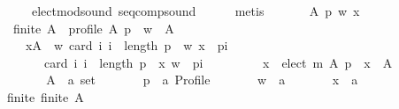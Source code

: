 \begin{isabellebody}
\ \ \ \ \ \ \ \ \ \ elect{\isacharunderscore}{\kern0pt}mod{\isacharunderscore}{\kern0pt}sound\ seq{\isacharunderscore}{\kern0pt}comp{\isacharunderscore}{\kern0pt}sound\isanewline
\ \ \ \ \isamarkupfalse%
\ metis\isanewline
{}\isamarkupfalse%
\isanewline
\ \ \isamarkupfalse%
\isanewline
\ \ \ \ {\isachardoublequoteopen}{\isasymAnd}A\ p\ w\ x{\isachardot}{\kern0pt}\isanewline
\ \ \ \ \ \ \ finite\ A\ {\isasymLongrightarrow}\ profile\ A\ p\ {\isasymLongrightarrow}\ w\ {\isasymin}\ A\ {\isasymLongrightarrow}\isanewline
\ \ \ \ \ \ \ \ \ {\isasymforall}x{\isasymin}A\ {\isacharminus}{\kern0pt}\ {\isacharbraceleft}{\kern0pt}w{\isacharbraceright}{\kern0pt}{\isachardot}{\kern0pt}\ card\ {\isacharbraceleft}{\kern0pt}i{\isachardot}{\kern0pt}\ i\ {\isacharless}{\kern0pt}\ length\ p\ {\isasymand}\ {\isacharparenleft}{\kern0pt}w{\isacharcomma}{\kern0pt}\ x{\isacharparenright}{\kern0pt}\ {\isasymin}\ {\isacharparenleft}{\kern0pt}p{\isacharbang}{\kern0pt}i{\isacharparenright}{\kern0pt}{\isacharbraceright}{\kern0pt}\ {\isacharless}{\kern0pt}\isanewline
\ \ \ \ \ \ \ \ \ \ \ \ card\ {\isacharbraceleft}{\kern0pt}i{\isachardot}{\kern0pt}\ i\ {\isacharless}{\kern0pt}\ length\ p\ {\isasymand}\ {\isacharparenleft}{\kern0pt}x{\isacharcomma}{\kern0pt}\ w{\isacharparenright}{\kern0pt}\ {\isasymin}\ {\isacharparenleft}{\kern0pt}p{\isacharbang}{\kern0pt}i{\isacharparenright}{\kern0pt}{\isacharbraceright}{\kern0pt}\ {\isasymLongrightarrow}\isanewline
\ \ \ \ \ \ \ \ x\ {\isasymin}\ elect\ m\ A\ p\ {\isasymLongrightarrow}\ x\ {\isasymin}\ A{\isachardoublequoteclose}\isanewline
\ \ \isamarkupfalse%
\ {\isacharminus}{\kern0pt}\isanewline
\ \ \ \ \isamarkupfalse%
\isanewline
\ \ \ \ \ \ A\ {\isacharcolon}{\kern0pt}{\isacharcolon}{\kern0pt}\ {\isachardoublequoteopen}{\isacharprime}{\kern0pt}a\ set{\isachardoublequoteclose}\ \isanewline
\ \ \ \ \ \ p\ {\isacharcolon}{\kern0pt}{\isacharcolon}{\kern0pt}\ {\isachardoublequoteopen}{\isacharprime}{\kern0pt}a\ Profile{\isachardoublequoteclose}\ \isanewline
\ \ \ \ \ \ w\ {\isacharcolon}{\kern0pt}{\isacharcolon}{\kern0pt}\ {\isachardoublequoteopen}{\isacharprime}{\kern0pt}a{\isachardoublequoteclose}\ \isanewline
\ \ \ \ \ \ x\ {\isacharcolon}{\kern0pt}{\isacharcolon}{\kern0pt}\ {\isachardoublequoteopen}{\isacharprime}{\kern0pt}a{\isachardoublequoteclose}\isanewline
\ \ \ \ \isamarkupfalse%
\isanewline
\ \ \ \ \ \ finite{\isacharcolon}{\kern0pt}\ {\isachardoublequoteopen}finite\ A{\isachardoublequoteclose}\ \isanewline

\end{isabellebody}
